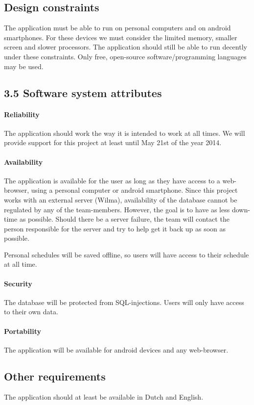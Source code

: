 \documentclass[12pt]{article}
\begin{document}
\subsection{Design constraints}\label{design-constraints}

The application must be able to run on personal computers and on android
smartphones. For these devices we must consider the limited memory,
smaller screen and slower processors. The application should still be
able to run decently under these constraints. Only free, open-source
software/programming languages may be used.

\subsection{3.5 Software system
attributes}\label{software-system-attributes}

\paragraph{Reliability}\label{reliability}

The application should work the way it is intended to work at all times.
We will provide support for this project at least until May 21st of the
year 2014.

\paragraph{Availability}\label{availability}

The application is available for the user as long as they have access to
a web-browser, using a personal computer or android smartphone. Since
this project works with an external server (Wilma), availability of the
database cannot be regulated by any of the team-members. However, the
goal is to have as less down-time as possible. Should there be a server
failure, the team will contact the person responsible for the server and
try to help get it back up as soon as possible.

Personal schedules will be saved offline, so users will have access to
their schedule at all time.

\paragraph{Security}\label{security}

The database will be protected from SQL-injections. Users will only have
access to their own data.

\paragraph{Portability}\label{portability}

The application will be available for android devices and any
web-browser.

\subsection{Other requirements}\label{other-requirements}

The application should at least be available in Dutch and English.
\end{document}

